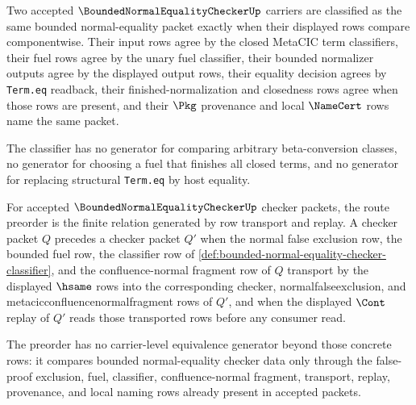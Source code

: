\begin{definition}
\label{def:bounded-normal-equality-checker-classifier}
Two accepted $\BoundedNormalEqualityCheckerUp$ carriers are classified as the
same bounded normal-equality packet exactly when their displayed rows compare
componentwise. Their input rows agree by the closed MetaCIC term classifiers,
their fuel rows agree by the unary fuel classifier, their bounded normalizer
outputs agree by the displayed output rows, their equality decision agrees by
\texttt{Term.eq} readback, their finished-normalization and closedness rows
agree when those rows are present, and their $\Pkg$ provenance and local
$\NameCert$ rows name the same packet.

The classifier has no generator for comparing arbitrary beta-conversion
classes, no generator for choosing a fuel that finishes all closed terms, and
no generator for replacing structural \texttt{Term.eq} by host equality.
\end{definition}

\begin{definition}
\label{def:bounded-normal-equality-checker-route-preorder}
For accepted $\BoundedNormalEqualityCheckerUp$ checker packets, the route preorder is the finite relation generated by row transport and replay. A checker packet $Q$ precedes a checker packet $Q'$ when the normal false exclusion row, the bounded fuel row, the classifier row of \autoref{def:bounded-normal-equality-checker-classifier}, and the confluence-normal fragment row of $Q$ transport by the displayed $\hsame$ rows into the corresponding checker, normalfalseexclusion, and metacicconfluencenormalfragment rows of $Q'$, and when the displayed $\Cont$ replay of $Q'$ reads those transported rows before any consumer read.

The preorder has no carrier-level equivalence generator beyond those concrete rows: it compares bounded normal-equality checker data only through the false-proof exclusion, fuel, classifier, confluence-normal fragment, transport, replay, provenance, and local naming rows already present in accepted packets.
\end{definition}

